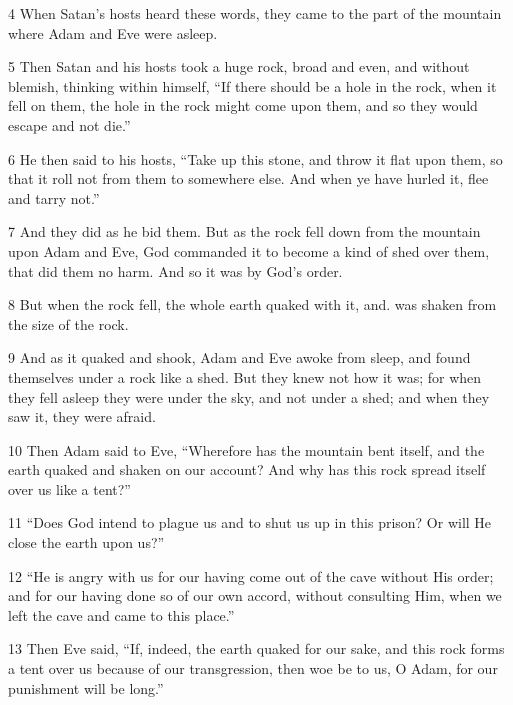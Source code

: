 \par 4 When Satan's hosts heard these words, they came to the part of the mountain where Adam and Eve were asleep.

\par 5 Then Satan and his hosts took a huge rock, broad and even, and without blemish, thinking within himself, “If there should be a hole in the rock, when it fell on them, the hole in the rock might come upon them, and so they would escape and not die.”

\par 6 He then said to his hosts, “Take up this stone, and throw it flat upon them, so that it roll not from them to somewhere else. And when ye have hurled it, flee and tarry not.”

\par 7 And they did as he bid them. But as the rock fell down from the mountain upon Adam and Eve, God commanded it to become a kind of shed over them, that did them no harm. And so it was by God's order.

\par 8 But when the rock fell, the whole earth quaked with it, and. was shaken from the size of the rock.

\par 9 And as it quaked and shook, Adam and Eve awoke from sleep, and found themselves under a rock like a shed. But they knew not how it was; for when they fell asleep they were under the sky, and not under a shed; and when they saw it, they were afraid.

\par 10 Then Adam said to Eve, “Wherefore has the mountain bent itself, and the earth quaked and shaken on our account? And why has this rock spread itself over us like a tent?”

\par 11 “Does God intend to plague us and to shut us up in this prison? Or will He close the earth upon us?”

\par 12 “He is angry with us for our having come out of the cave without His order; and for our having done so of our own accord, without consulting Him, when we left the cave and came to this place.”

\par 13 Then Eve said, “If, indeed, the earth quaked for our sake, and this rock forms a tent over us because of our transgression, then woe be to us, O Adam, for our punishment will be long.”

